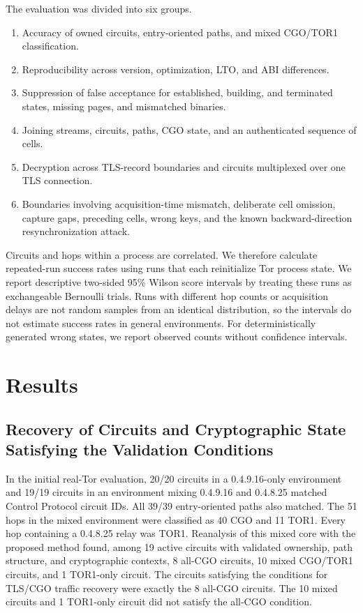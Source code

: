 \documentclass[10pt,a4paper]{article}
\newcommand{\torone}{\textsc{TOR1}}
\begin{document}
The evaluation was divided into six groups.

\begin{enumerate}
  \item Accuracy of owned circuits, entry-oriented paths, and mixed CGO/\torone{} classification.
  \item Reproducibility across version, optimization, LTO, and ABI differences.
  \item Suppression of false acceptance for established, building, and terminated states, missing pages, and mismatched binaries.
  \item Joining streams, circuits, paths, CGO state, and an authenticated sequence of cells.
  \item Decryption across TLS-record boundaries and circuits multiplexed over one TLS connection.
  \item Boundaries involving acquisition-time mismatch, deliberate cell omission, capture gaps, preceding cells, wrong keys, and the known backward-direction resynchronization attack.
\end{enumerate}

Circuits and hops within a process are correlated. We therefore calculate repeated-run success rates using runs that each reinitialize Tor process state. We report descriptive two-sided 95\% Wilson score intervals by treating these runs as exchangeable Bernoulli trials. Runs with different hop counts or acquisition delays are not random samples from an identical distribution, so the intervals do not estimate success rates in general environments. For deterministically generated wrong states, we report observed counts without confidence intervals.

\section{Results}\label{sec:results}

\subsection{Recovery of Circuits and Cryptographic State Satisfying the Validation Conditions}

In the initial real-Tor evaluation, 20/20 circuits in a 0.4.9.16-only environment and 19/19 circuits in an environment mixing 0.4.9.16 and 0.4.8.25 matched Control Protocol circuit IDs. All 39/39 entry-oriented paths also matched.
The 51 hops in the mixed environment were classified as 40 CGO and 11 \torone{}. Every hop containing a 0.4.8.25 relay was \torone{}.
Reanalysis of this mixed core with the proposed method found, among 19 active circuits with validated ownership, path structure, and cryptographic contexts, 8 all-CGO circuits, 10 mixed CGO/\torone{} circuits, and 1 \torone{}-only circuit. The circuits satisfying the conditions for TLS/CGO traffic recovery were exactly the 8 all-CGO circuits. The 10 mixed circuits and 1 \torone{}-only circuit did not satisfy the all-CGO condition.
\end{document}
